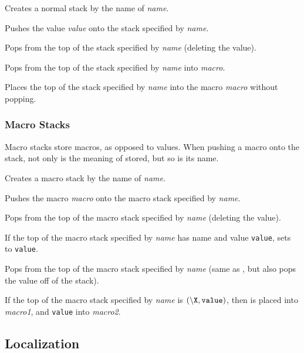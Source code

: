 Creates a normal stack by the name of {\it name}.
\emacroexp

Pushes the value {\it value} onto the stack specified by {\it name}.
\emacroexp

Pops from the top of the stack specified by {\it name} (deleting the value).
\emacroexp

Pops from the top of the stack specified by {\it name} into {\it macro}.
\emacroexp

Places the top of the stack specified by {\it name} into the macro {\it macro} without popping.
\emacroexp

\subsubsection{Macro Stacks} 

Macro stacks store macros, as opposed to values.
When pushing a macro \macro\X{} onto the stack, not only is the meaning of \macro\X{} stored, but so is its name.

Creates a macro stack by the name of {\it name}.
\emacroexp

Pushes the macro {\it macro} onto the macro stack specified by {\it name}.
\emacroexp

Pops from the top of the macro stack specified by {\it name} (deleting the value).
\emacroexp

If the top of the macro stack specified by {\it name} has name \macro\X{} and value {\tt value}, sets \macro\X{} to {\tt value}.
\emacroexp

Pops from the top of the macro stack specified by {\it name} (same as \macro\macrostackset, but also pops the value off of the stack).
\emacroexp

If the top of the macro stack specified by {\it name} is $(\macro\X,{\tt value})$, then \macro\X{} is placed into {\it macro1}, and {\tt value} into {\it macro2}.
\emacroexp

\subsection{Localization} 

